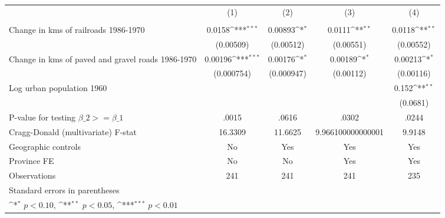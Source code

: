 {
\def\sym#1{\ifmmode^{#1}\else\(^{#1}\)\fi}
\begin{tabular}{l*{4}{c}}
\hline\hline
                &\multicolumn{1}{c}{(1)}&\multicolumn{1}{c}{(2)}&\multicolumn{1}{c}{(3)}&\multicolumn{1}{c}{(4)}\\
                &\multicolumn{1}{c}{}&\multicolumn{1}{c}{}&\multicolumn{1}{c}{}&\multicolumn{1}{c}{}\\
\hline
Change in kms of railroads 1986-1970&   0.0158\sym{***}&  0.00893\sym{*}  &   0.0111\sym{**} &   0.0118\sym{**} \\
                &(0.00509)         &(0.00512)         &(0.00551)         &(0.00552)         \\
[1em]
Change in kms of paved and gravel roads 1986-1970&  0.00196\sym{***}&  0.00176\sym{*}  &  0.00189\sym{*}  &  0.00213\sym{*}  \\
                &(0.000754)         &(0.000947)         &(0.00112)         &(0.00116)         \\
[1em]
Log urban population 1960&                  &                  &                  &    0.152\sym{**} \\
                &                  &                  &                  & (0.0681)         \\
\hline
P-value for testing $\beta\_{2} >= \beta\_{1}$&    .0015         &    .0616         &    .0302         &    .0244         \\
Cragg-Donald (multivariate) F-stat&  16.3309         &  11.6625         &9.966100000000001         &   9.9148         \\
Geographic controls&       No         &      Yes         &      Yes         &      Yes         \\
Province FE     &       No         &       No         &      Yes         &      Yes         \\
Observations    &      241         &      241         &      241         &      235         \\
\hline\hline
\multicolumn{5}{l}{\footnotesize Standard errors in parentheses}\\
\multicolumn{5}{l}{\footnotesize \sym{*} \(p<0.10\), \sym{**} \(p<0.05\), \sym{***} \(p<0.01\)}\\
\end{tabular}
}
